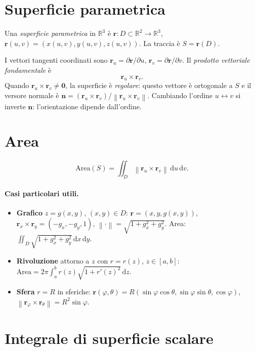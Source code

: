 \documentclass[11pt,a4paper,openany]{book}
\theoremstyle{plain}
\theoremstyle{definition}
\theoremstyle{remark}
\newcommand{\R}{\mathbb{R}}
\newcommand{\dd}{\,\mathrm{d}}
\renewcommand{\vec}[1]{\mathbf{#1}}
\newcommand{\rr}{\mathbf{r}}
\newcommand{\nn}{\mathbf{n}}
\newcommand{\norm}[1]{\left\lVert #1 \right\rVert}
\begin{document}
\section{Superficie parametrica}

Una \emph{superficie parametrica} in $\R^3$ \`e $\rr:D\subset\R^2\to\R^3$,
$\rr(u,v)=(x(u,v),y(u,v),z(u,v))$. La traccia \`e $S=\rr(D)$.

I vettori tangenti coordinati sono $\rr_u=\partial\rr/\partial u$,
$\rr_v=\partial\rr/\partial v$. Il \emph{prodotto vettoriale fondamentale} \`e
\begin{equation}
  \rr_u\times\rr_v.
  \label{eq:prodfond}
\end{equation}
Quando $\rr_u\times\rr_v\ne\vec{0}$, la superficie \`e \emph{regolare}: questo
vettore \`e ortogonale a $S$ e il versore normale \`e
$\nn=(\rr_u\times\rr_v)/\norm{\rr_u\times\rr_v}$. Cambiando l'ordine
$u\leftrightarrow v$ si inverte $\nn$: l'orientazione dipende dall'ordine.

\section{Area}

\begin{equation}
  \text{Area}(S)=\iint_D \norm{\rr_u\times\rr_v}\dd u\dd v.
  \label{eq:area-sup}
\end{equation}

\paragraph{Casi particolari utili.}
\begin{itemize}[leftmargin=*]
  \item \textbf{Grafico} $z=g(x,y)$, $(x,y)\in D$: $\rr=(x,y,g(x,y))$,
        $\rr_x\times\rr_y=(-g_x,-g_y,1)$,
        $\norm{\cdot}=\sqrt{1+g_x^2+g_y^2}$. Area: $\iint_D\sqrt{1+g_x^2+g_y^2}\dd x\dd y$.
  \item \textbf{Rivoluzione} attorno a $z$ con $r=r(z)$, $z\in[a,b]$:
        $\text{Area}=2\pi\int_a^b r(z)\sqrt{1+r'(z)^2}\dd z$.
  \item \textbf{Sfera} $r=R$ in sferiche:
        $\rr(\varphi,\theta)=R(\sin\varphi\cos\theta,\sin\varphi\sin\theta,\cos\varphi)$,
        $\norm{\rr_\varphi\times\rr_\theta}=R^2\sin\varphi$.
\end{itemize}

\section{Integrale di superficie scalare}
\end{document}
